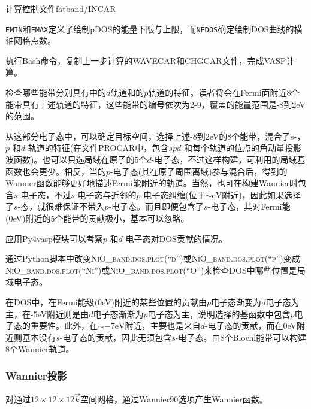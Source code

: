 计算控制文件\textrm{fatband/INCAR}

\texttt{EMIN}和\texttt{EMAX}定义了绘制\textrm{pDOS}的能量下限与上限，而\texttt{NEDOS}确定绘制\textrm{DOS}曲线的横轴网格点数。

执行\textrm{Bash}命令，复制上一步计算的\textrm{WAVECAR}和\textrm{CHGCAR}文件，完成\textrm{VASP}计算。

检查哪些能带分别具有中的$d$轨道和的$p$轨道的特征。读者将会在\textrm{Fermi}面附近8个能带具有上述轨道的特征，这些能带的编号依次为2-9，覆盖的能量范围是-8到\textrm{2eV}的范围。

从这部分电子态中，可以确定目标空间，选择上述-8到\textrm{2eV}的8个能带，混合了$s$-，$p$-和$d$-轨道的特征(在文件\textrm{PROCAR}中，包含$spd$-和每个轨道的位点的角动量投影波函数)。也可以只选局域在原子的5个$d$-电子态，不过这样构建，可利用的局域基函数也会更少。相反，当的$p$-电子态(其在原子周围离域)参与混合后，得到的\textrm{Wannier}函数能够更好地描述\textrm{Fermi}能附近的轨道。当然，也可在构建\textrm{Wannier}时包含$s$-电子态，不过$s$-电子态与近邻的$p$-电子态纠缠(位于$\sim\mathrm{eV}$附近)，因此如果选择了$s$-态，就很难保证不带入$p$-电子态。而且即便包含了$s$-电子态，其对\textrm{Fermi}能\textrm{(0eV)}附近的5个能带的贡献极小，基本可以忽略。

应用\textrm{Py4vasp}模块可以考察$p$-和$d$-电子态对\textrm{DOS}贡献的情况。

通过\textrm{Python}脚本中改变\textsc{NiO\_band.dos.plot(``d'')}或\textsc{NiO\_band.dos.plot(``p'')}变成\textsc{NiO\_band.dos.plot(``Ni'')}或\textsc{NiO\_band.dos.plot(``O'')}来检查\textrm{DOS}中哪些位置是局域电子态。

在\textrm{DOS}中，在\textrm{Fermi}能级\textrm{(0eV)}附近的某些位置的贡献由$p$电子态渐变为$d$电子态为主，在\textrm{-5eV}附近则是由$d$电子态渐渐为$p$电子态为主，说明选择的基函数中包含$p$电子态的重要性。此外，在$\sim-7\mathrm{eV}$附近，主要也是来自$d$-电子态的贡献，而在\textrm{0eV}附近则基本没有$s$-电子态的贡献，因此无须包含$s$-电子态。由8个\textrm{Blochl}能带可以构建8个\textrm{Wannier}轨道。%

\subsubsection{\rm{Wannier}投影}
对通过$12\times12\times12$$\vec k$空间网格，通过\textrm{Wannier90}选项产生\textrm{Wannier}函数。

